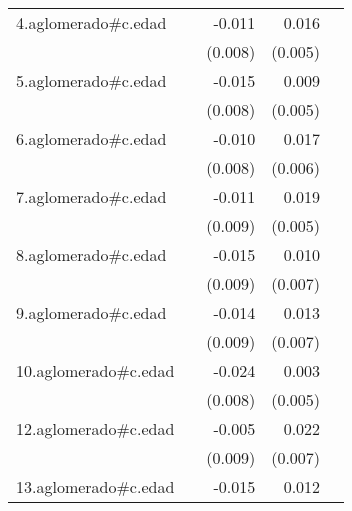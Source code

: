 {\begin{longtable}{l*{4}{D{.}{.}{-1}}}
\addlinespace
4.aglomerado#c.edad&                     &      -0.011         &       0.016\sym{**} &                     \\
            &                     &     (0.008)         &     (0.005)         &                     \\
\addlinespace
5.aglomerado#c.edad&                     &      -0.015         &       0.009         &                     \\
            &                     &     (0.008)         &     (0.005)         &                     \\
\addlinespace
6.aglomerado#c.edad&                     &      -0.010         &       0.017\sym{**} &                     \\
            &                     &     (0.008)         &     (0.006)         &                     \\
\addlinespace
7.aglomerado#c.edad&                     &      -0.011         &       0.019\sym{***}&                     \\
            &                     &     (0.009)         &     (0.005)         &                     \\
\addlinespace
8.aglomerado#c.edad&                     &      -0.015         &       0.010         &                     \\
            &                     &     (0.009)         &     (0.007)         &                     \\
\addlinespace
9.aglomerado#c.edad&                     &      -0.014         &       0.013         &                     \\
            &                     &     (0.009)         &     (0.007)         &                     \\
\addlinespace
10.aglomerado#c.edad&                     &      -0.024\sym{**} &       0.003         &                     \\
            &                     &     (0.008)         &     (0.005)         &                     \\
\addlinespace
12.aglomerado#c.edad&                     &      -0.005         &       0.022\sym{***}&                     \\
            &                     &     (0.009)         &     (0.007)         &                     \\
\addlinespace
13.aglomerado#c.edad&                     &      -0.015         &       0.012\sym{**} &                     \\

\end{longtable}}
